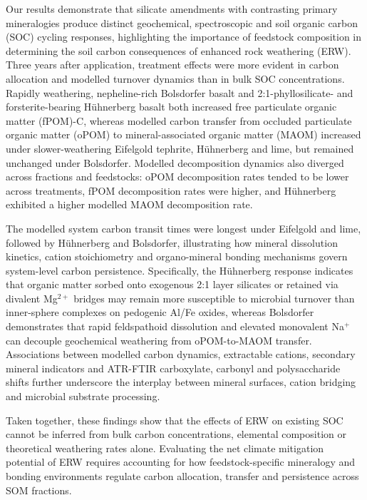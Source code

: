 \documentclass[preprint,12pt]{elsarticle}
\begin{document}
Our results demonstrate that silicate amendments with contrasting primary mineralogies produce distinct geochemical, spectroscopic and soil organic carbon (SOC) cycling responses, highlighting the importance of feedstock composition in determining the soil carbon consequences of enhanced rock weathering (ERW). Three years after application, treatment effects were more evident in carbon allocation and modelled turnover dynamics than in bulk SOC concentrations. Rapidly weathering, nepheline-rich Bolsdorfer basalt and 2:1-phyllosilicate- and forsterite-bearing H\"uhnerberg basalt both increased free particulate organic matter (fPOM)-C, whereas modelled carbon transfer from occluded particulate organic matter (oPOM) to mineral-associated organic matter (MAOM) increased under slower-weathering Eifelgold tephrite, H\"uhnerberg and lime, but remained unchanged under Bolsdorfer. Modelled decomposition dynamics also diverged across fractions and feedstocks: oPOM decomposition rates tended to be lower across treatments, fPOM decomposition rates were higher, and H\"uhnerberg exhibited a higher modelled MAOM decomposition rate.

The modelled system carbon transit times were longest under Eifelgold and lime, followed by H\"uhnerberg and Bolsdorfer, illustrating how mineral dissolution kinetics, cation stoichiometry and organo-mineral bonding mechanisms govern system-level carbon persistence. Specifically, the H\"uhnerberg response indicates that organic matter sorbed onto exogenous 2:1 layer silicates or retained via divalent Mg$^{2+}$ bridges may remain more susceptible to microbial turnover than inner-sphere complexes on pedogenic Al/Fe oxides, whereas Bolsdorfer demonstrates that rapid feldspathoid dissolution and elevated monovalent Na$^{+}$ can decouple geochemical weathering from oPOM-to-MAOM transfer. Associations between modelled carbon dynamics, extractable cations, secondary mineral indicators and ATR-FTIR carboxylate, carbonyl and polysaccharide shifts further underscore the interplay between mineral surfaces, cation bridging and microbial substrate processing.

Taken together, these findings show that the effects of ERW on existing SOC cannot be inferred from bulk carbon concentrations, elemental composition or theoretical weathering rates alone. Evaluating the net climate mitigation potential of ERW requires accounting for how feedstock-specific mineralogy and bonding environments regulate carbon allocation, transfer and persistence across SOM fractions.
\end{document}
